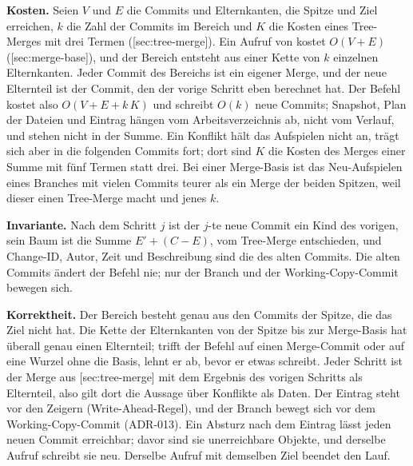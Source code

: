 \startplacefigure[title={Verlauf und Zeiger beim Rebase von \type{feature} auf \type{main}, mit den
    Zuständen nach einem Absturz},
    reference=fig:rebase-pointers,location=here]
\stopplacefigure

{\bf Kosten.} Seien $V$ und $E$ die Commits und Elternkanten, die Spitze und Ziel erreichen,
$k$ die Zahl der Commits im Bereich und $K$ die Kosten eines Tree-Merges mit drei Termen
([sec:tree-merge]).
Ein Aufruf von  kostet $O(V+E)$ ([sec:merge-base]),
und der Bereich entsteht aus einer Kette von $k$ einzelnen Elternkanten.
Jeder Commit des Bereichs ist ein eigener Merge, und der neue Elternteil ist der Commit,
den der vorige Schritt eben berechnet hat.
Der Befehl kostet also $O(V+E+k\,K)$ und schreibt $O(k)$ neue Commits;
Snapshot, Plan der Dateien und Eintrag hängen vom Arbeitsverzeichnis ab, nicht vom Verlauf,
und stehen nicht in der Summe.
Ein Konflikt hält das Aufspielen nicht an, trägt sich aber in die folgenden Commits fort;
dort sind $K$ die Kosten des Merges einer Summe mit fünf Termen statt drei.
Bei einer Merge-Basis ist das Neu-Aufspielen eines Branches mit vielen Commits teurer als
ein Merge der beiden Spitzen, weil dieser einen Tree-Merge macht und jenes $k$.

{\bf Invariante.} Nach dem Schritt $j$ ist der $j$-te neue Commit ein Kind des vorigen,
sein Baum ist die Summe $E' + (C - E)$, vom Tree-Merge entschieden,
und Change-ID, Autor, Zeit und Beschreibung sind die des alten
Commits. Die alten Commits ändert der Befehl nie; nur der Branch und der Working-Copy-Commit
bewegen sich.

{\bf Korrektheit.} Der Bereich besteht genau aus den Commits der Spitze, die das Ziel nicht hat.
Die Kette der Elternkanten von der Spitze bis zur Merge-Basis hat überall genau einen Elternteil;
trifft der Befehl auf einen Merge-Commit oder auf eine Wurzel ohne die Basis, lehnt er ab,
bevor er etwas schreibt.
Jeder Schritt ist der Merge aus [sec:tree-merge] mit dem Ergebnis des vorigen
Schritts als Elternteil, also gilt dort die Aussage über Konflikte als Daten.
Der Eintrag steht vor den Zeigern (Write-Ahead-Regel),
und der Branch bewegt sich vor dem Working-Copy-Commit (ADR-013).
Ein Absturz nach dem Eintrag lässt jeden neuen Commit erreichbar;
davor sind sie unerreichbare Objekte, und derselbe Aufruf schreibt sie neu.
Derselbe Aufruf mit demselben Ziel beendet den Lauf.

